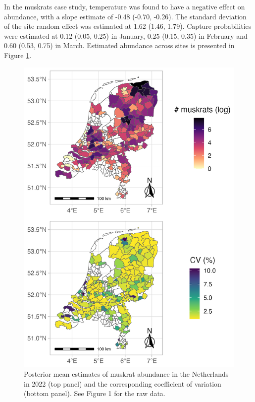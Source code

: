 \documentclass[
  11pt,
  a4paper,
]{article}
\begin{document}
In the muskrats case study, temperature was found to have a negative effect on abundance, with a slope estimate of -0.48 (-0.70, -0.26). The standard deviation of the site random effect was estimated at 1.62 (1.46, 1.79). Capture probabilities were estimated at 0.12 (0.05, 0.25) in January, 0.25 (0.15, 0.35) in February and 0.60 (0.53, 0.75) in March. Estimated abundance across sites is presented in Figure \ref{fig:muskrats}.

\begin{figure}[H]

{\centering \includegraphics[width=0.95\linewidth]{muskrats} 

}

\caption{Posterior mean estimates of muskrat abundance in the Netherlands in 2022 (top panel) and the corresponding coefficient of variation (bottom panel). See Figure 1 for the raw data.}\label{fig:muskrats}
\end{figure}
\end{document}
